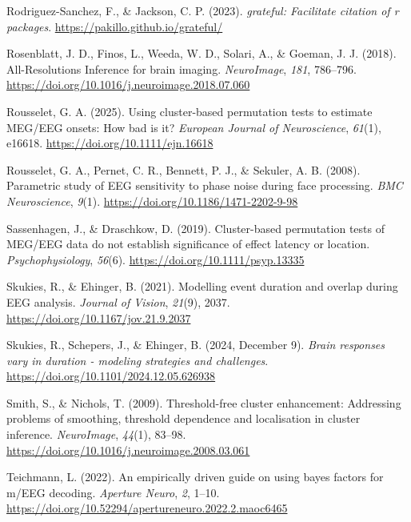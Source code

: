 \documentclass[
  doc,
  floatsintext,
  longtable,
  a4paper,
  nolmodern,
  notxfonts,
  notimes,
  colorlinks=true,linkcolor=blue,citecolor=blue,urlcolor=blue]{apa7}
\newlength{\cslhangindent}
\newenvironment{CSLReferences}[2] %
 {\begin{list}{}{%
  \setlength{\itemindent}{0pt}
  \setlength{\leftmargin}{0pt}
  \setlength{\parsep}{0pt}
  \ifodd #1
   \setlength{\leftmargin}{\cslhangindent}
   \setlength{\itemindent}{-1\cslhangindent}
  \fi
  \setlength{\itemsep}{#2\baselineskip}}}
 {\end{list}}
\begin{document}
\begin{CSLReferences}{1}{0}
Rodriguez-Sanchez, F., \& Jackson, C. P. (2023). \emph{{grateful}:
Facilitate citation of r packages}.
\url{https://pakillo.github.io/grateful/}

Rosenblatt, J. D., Finos, L., Weeda, W. D., Solari, A., \& Goeman, J. J.
(2018). All-Resolutions Inference for brain imaging. \emph{NeuroImage},
\emph{181}, 786--796.
\url{https://doi.org/10.1016/j.neuroimage.2018.07.060}

Rousselet, G. A. (2025). Using cluster-based permutation tests to
estimate {MEG}/{EEG} onsets: {How} bad is it? \emph{European Journal of
Neuroscience}, \emph{61}(1), e16618.
\url{https://doi.org/10.1111/ejn.16618}

Rousselet, G. A., Pernet, C. R., Bennett, P. J., \& Sekuler, A. B.
(2008). Parametric study of EEG sensitivity to phase noise during face
processing. \emph{BMC Neuroscience}, \emph{9}(1).
\url{https://doi.org/10.1186/1471-2202-9-98}

Sassenhagen, J., \& Draschkow, D. (2019). Cluster{-}based permutation
tests of MEG/EEG data do not establish significance of effect latency or
location. \emph{Psychophysiology}, \emph{56}(6).
\url{https://doi.org/10.1111/psyp.13335}

Skukies, R., \& Ehinger, B. (2021). Modelling event duration and overlap
during {EEG} analysis. \emph{Journal of Vision}, \emph{21}(9), 2037.
\url{https://doi.org/10.1167/jov.21.9.2037}

Skukies, R., Schepers, J., \& Ehinger, B. (2024, December 9).
\emph{Brain responses vary in duration - modeling strategies and
challenges}. \url{https://doi.org/10.1101/2024.12.05.626938}

Smith, S., \& Nichols, T. (2009). Threshold-free cluster enhancement:
Addressing problems of smoothing, threshold dependence and localisation
in cluster inference. \emph{NeuroImage}, \emph{44}(1), 83--98.
\url{https://doi.org/10.1016/j.neuroimage.2008.03.061}

Teichmann, L. (2022). An empirically driven guide on using bayes factors
for m/EEG decoding. \emph{Aperture Neuro}, \emph{2}, 1--10.
\url{https://doi.org/10.52294/apertureneuro.2022.2.maoc6465}


\end{CSLReferences}
\end{document}
